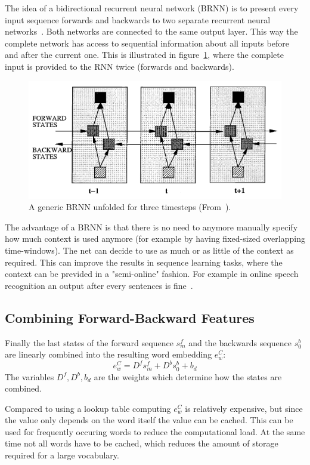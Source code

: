 The idea of a bidirectional recurrent neural network (BRNN) is to present every input sequence forwards and backwards to two separate
recurrent neural networks~\cite{IEEE:journals/singals/Schuster1997}.
Both networks are connected to the same output layer. This way the complete network has access to sequential information 
about all inputs before and after the current one.
This is illustrated in figure~\ref{fig:brnn-unfolded}, where the complete input is provided to the RNN twice (forwards and backwards).
\begin{figure}[H]
\begin{center}
  \includegraphics[width=\textwidth]{./img/brnn-unfolded}
  \caption{A generic BRNN unfolded for three timesteps (From~\cite{IEEE:journals/singals/Schuster1997}).}
  \label{fig:brnn-unfolded}
\end{center}
\end{figure}

The advantage of a BRNN is that there is no need to anymore manually specify how much context is 
used anymore (for example by having fixed-sized overlapping time-windows).
The net can decide to use as much or as little of the context as required. 
This can improve the results in sequence learning tasks, where the context can be previded in a "semi-online" fashion.
For example in online speech recognition an output after every sentences is fine~\cite{DBLP:journals/nn/GravesS05}. 




\subsection{Combining Forward-Backward Features}

Finally the last states of the forward sequence $s_{m}^f$ and the backwards sequence $s_{0}^b$
are linearly combined into the resulting word embedding $e_{w}^C$:
\[
  e_{w}^C = D^f s_{m}^f + D^b s_{0}^b + b_d
\]
The variables $D^f, D^b, b_d$ are the weights which determine how the states are combined.

Compared to using a lookup table computing $e_{w}^C$ is relatively expensive, but since the value only depends on
the word itself the value can be cached. This can be used for frequently occuring words to reduce the computational load.
At the same time not all words have to be cached, which reduces the amount of storage required for a large vocabulary.